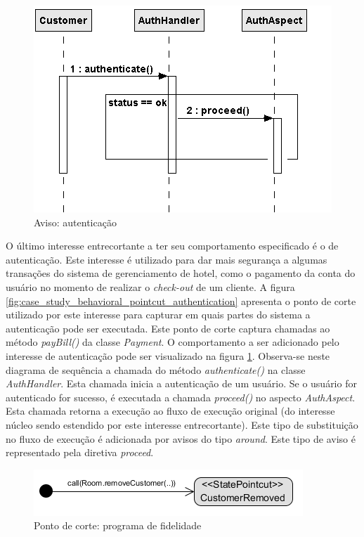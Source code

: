   \begin{figure}
	\centering
	\includegraphics{img/case_study_behavioral_authentication.png}
	\caption{Aviso: autenticação}\label{fig:case_study_behavioral_authentication}
  \end{figure}

O último interesse entrecortante a ter seu comportamento especificado é o de autenticação. Este interesse é utilizado para dar mais segurança a
algumas transações do sistema de gerenciamento de hotel, como o pagamento da conta do usuário no momento de realizar o \textit{check-out} de um
cliente. A figura \ref{fig:case_study_behavioral_pointcut_authentication} apresenta o ponto de corte utilizado por este interesse para capturar em
quais partes do sistema a autenticação pode ser executada. Este ponto de corte captura chamadas ao método \textit{payBill()} da classe \textit{Payment}. 
O comportamento a ser adicionado pelo interesse de autenticação pode ser visualizado na figura
\ref{fig:case_study_behavioral_authentication}. Observa-se neste diagrama de sequência a chamada do método \textit{authenticate()} na classe 
\textit{AuthHandler}. Esta chamada inicia a autenticação de um usuário. Se o usuário for autenticado for sucesso, é executada a chamada
\textit{proceed()} no aspecto \textit{AuthAspect}. Esta chamada retorna a execução ao fluxo de execução original (do interesse núcleo sendo estendido
por este interesse entrecortante). Este tipo de substituição no fluxo de execução é adicionada por avisos do tipo \textit{around}. Este tipo de aviso
é representado pela diretiva \textit{proceed}.

  \begin{figure}[!h]
	\centering
	\includegraphics{img/case_study_behavioral_pointcut_loyalty_points.png}
	\caption{Ponto de corte: programa de fidelidade}\label{fig:case_study_behavioral_pointcut_loyalty_points}
  \end{figure}
  
